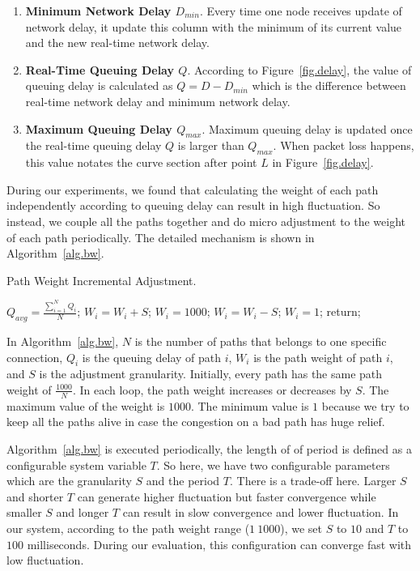 \begin{enumerate}
\item \textbf{Minimum Network Delay $D_{min}$}. Every time one node receives update of network delay, it update this column with the minimum of its current value and the new real-time network delay.
\item \textbf{Real-Time Queuing Delay $Q$}. According to Figure~\ref{fig.delay}, the value of queuing delay is calculated as $Q=D-D_{min}$ which is the difference between real-time network delay and minimum network delay.
\item \textbf{Maximum Queuing Delay $Q_{max}$}. Maximum queuing delay is updated once the real-time queuing delay $Q$ is larger than $Q_{max}$. When packet loss happens, this value notates the curve section after point $L$ in Figure~\ref{fig.delay}.
\end{enumerate}


During our experiments, we found that calculating the weight of each path independently according to queuing delay can result in high fluctuation. So instead, we couple all the paths together and do micro adjustment to the weight of each path periodically. The detailed mechanism is shown in Algorithm~\ref{alg.bw}.

\begin{algorithm}
\caption{Path Weight Incremental Adjustment.}
\label{alg.bw}
\begin{algorithmic}[1]
\STATE  $Q_{avg}= \frac{\sum_{i=1}^{N}Q_i}{N}$;
    \STATE $W_i=W_i+S$;
	    \STATE $W_i=1000$;
	\ENDIF
\ELSE
    \STATE $W_i=W_i-S$;
	    \STATE $W_i=1$;
	\ENDIF
\ENDIF
\STATE return;
\end{algorithmic}
\end{algorithm}

In Algorithm~\ref{alg.bw}, $N$ is the number of paths that belongs to one specific connection, $Q_i$ is the queuing delay of path $i$, $W_i$ is the path weight of path $i$, and $S$ is the adjustment granularity. Initially, every path has the same path weight of $\frac{1000}{N}$. In each loop, the path weight increases or decreases by $S$. The maximum value of the weight is $1000$. The minimum value is $1$ because we try to keep all the paths alive in case the congestion on a bad path has huge relief.

Algorithm~\ref{alg.bw} is executed periodically, the length of of period is defined as a configurable system variable $T$. So here, we have two configurable parameters which are the granularity $S$ and the period $T$. There is a trade-off here. Larger $S$ and shorter $T$ can generate higher fluctuation but faster convergence while smaller $S$ and longer $T$ can result in slow convergence and lower fluctuation. In our system, according to the path weight range ($1~1000$), we set $S$ to $10$ and $T$ to $100$ milliseconds. During our evaluation, this configuration can converge fast with low fluctuation.

